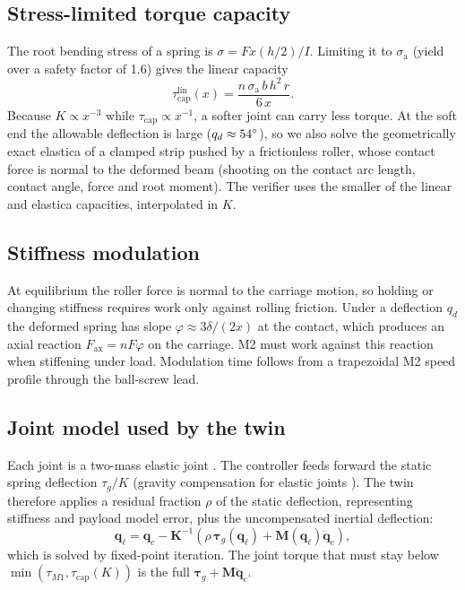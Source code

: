 \documentclass[journal]{IEEEtran}
\begin{document}
\subsection{Stress-limited torque capacity}
The root bending stress of a spring is $\sigma=Fx(h/2)/I$. Limiting it to $\sigma_\mathrm{a}$ (yield over a safety factor of 1.6) gives the linear capacity
\begin{equation}
\tau_\mathrm{cap}^\mathrm{lin}(x)=\frac{n\,\sigma_\mathrm{a}\,b\,h^2\,r}{6\,x}.
\label{eq:cap}
\end{equation}
Because $K\propto x^{-3}$ while $\tau_\mathrm{cap}\propto x^{-1}$, a softer joint can carry less torque. At the soft end the allowable deflection is large ($q_d\approx54^\circ$), so we also solve the geometrically exact elastica of a clamped strip pushed by a frictionless roller, whose contact force is normal to the deformed beam (shooting on the contact arc length, contact angle, force and root moment). The verifier uses the smaller of the linear and elastica capacities, interpolated in $K$.

\subsection{Stiffness modulation}
At equilibrium the roller force is normal to the carriage motion, so holding or changing stiffness requires work only against rolling friction. Under a deflection $q_d$ the deformed spring has slope $\varphi\approx 3\delta/(2x)$ at the contact, which produces an axial reaction $F_\mathrm{ax}=nF\varphi$ on the carriage. M2 must work against this reaction when stiffening under load. Modulation time follows from a trapezoidal M2 speed profile through the ball-screw lead.

\subsection{Joint model used by the twin}
Each joint is a two-mass elastic joint \cite{spong1987}. The controller feeds forward the static spring deflection $\tau_g/K$ (gravity compensation for elastic joints \cite{deluca2005}). The twin therefore applies a residual fraction $\rho$ of the static deflection, representing stiffness and payload model error, plus the uncompensated inertial deflection:
\begin{equation}
\bm q_\ell=\bm q_c-\bm K^{-1}\left(\rho\,\bm\tau_g(\bm q_\ell)+\bm M(\bm q_\ell)\ddot{\bm q}_c\right),
\label{eq:defl}
\end{equation}
which is solved by fixed-point iteration. The joint torque that must stay below $\min(\tau_{M1},\tau_\mathrm{cap}(K))$ is the full $\bm\tau_g+\bm M\ddot{\bm q}_c$.
\end{document}
